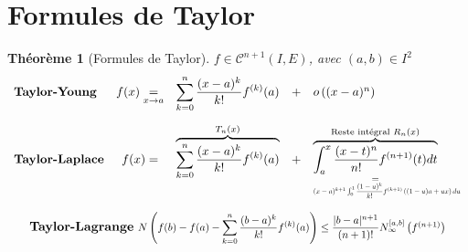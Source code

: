 \documentclass[11pt,a4paper]{report}
\newtheorem{itheorem}[theorem]{Théorème}
\theoremstyle{definition}
\begin{document}
\section{Formules de Taylor}
\begin{itheorem}[Formules de Taylor]
$f\in\mathcal{C}^{n+1}(I,E)$, avec $(a,b)\in I^2$
\[
\begin{array}{l c r c l}
\text{\textbf{Taylor-Young}}&f(x)\underset{x\to a}{=}&\displaystyle \sum_{k=0}^{n} \dfrac{(x-a)^k}{k!}f^{(k)}(a)&+&o\left( (x-a)^n \right)   \\[0.7cm]
\text{\textbf{Taylor-Laplace}}&f(x)=&\overbrace{\sum_{k=0}^n \dfrac{(x-a)^k}{k!}f^{(k)}(a)}^{\mathclap{T_n(x)}} & + & \underset{=}{\overbrace{\int_a^x \dfrac{(x-t)^{n}}{n!}f^{(n+1)}(t)dt}^{\mathclap{\text{Reste intégral }R_n(x)}}}\\
&&&&\resizebox{.35\hsize}{!}{$(x-a)^{k+1}\int_0^1\dfrac{(1-u)^k}{k!}f^{(k+1)}\left( (1-u)a+ux \right) du$}\\
\end{array}\\
\]

\[
\text{\textbf{Taylor-Lagrange} } \resizebox{.7\hsize}{!}{$N\left( f(b) - f(a) - \displaystyle\sum_{k=0}^n\dfrac{(b-a)^k}{k!}f^{(k)}(a) \right)\le \dfrac{|b-a|^{n+1}}{(n+1)!}N_\infty^{[a,b]}\left( f^{(n+1)} \right)$}
\]

\end{itheorem}
\end{document}
